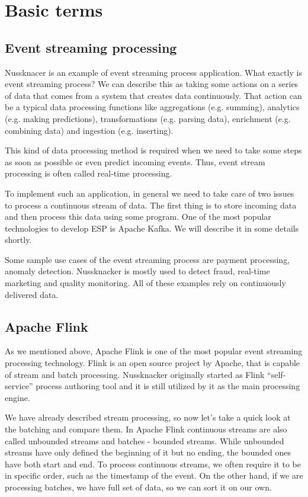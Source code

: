 \chapter{Basic terms}
\label{chap:basic}

\section{Event streaming processing}

Nussknacer is an example of event streaming process application. What exactly is event streaming process?
We can describe this as taking some actions on a series of data that comes from a system that creates data continuously.
That action can be a typical data processing functions like aggregations (e.g. summing),
analytics (e.g. making predictions), transformations (e.g. parsing data), enrichment (e.g. combining data)
and ingestion (e.g. inserting).

This kind of data processing method is required when we need to take some steps as soon as possible or even predict incoming events.
Thus, event stream processing is often called real-time processing.

To implement such an application, in general we need to take care of two issues to process a continuous stream of data.
The first thing is to store incoming data and then process this data using some program.
One of the most popular technologies to develop ESP is Apache Kafka. We will describe it in some details shortly.

Some sample use cases of the event streaming process are payment processing, anomaly detection.
Nussknacker is mostly used to detect fraud, real-time marketing and quality monitoring.
All of these examples rely on continuously delivered data.\cite{esp}

\section{Apache Flink}

As we mentioned above, Apache Flink is one of the most popular event streaming processing technology.
Flink is an open source project by Apache, that is capable of stream and batch processing. Nussknacker originally started
as Flink “self-service” process authoring tool and it is still utilized by it as the main processing engine.

We have already described stream processing, so now let’s take a quick look at the batching and compare them.
In Apache Flink continuous streams are also called unbounded streams and batches -  bounded streams.
While unbounded streams have only defined the beginning of it but no ending, the bounded ones have both start and end.
To process continuous streams, we often require it to be in specific order, such as the timestamp of the event.
On the other hand, if we are processing batches, we have full set of data, so we can sort it on our own.

